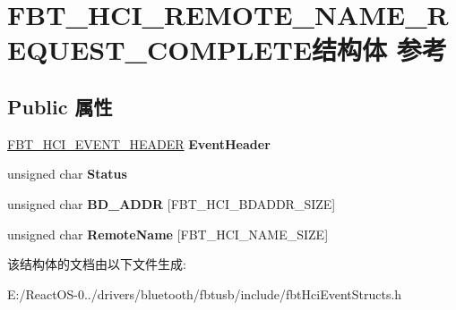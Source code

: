 \hypertarget{struct_f_b_t___h_c_i___r_e_m_o_t_e___n_a_m_e___r_e_q_u_e_s_t___c_o_m_p_l_e_t_e}{}\section{F\+B\+T\+\_\+\+H\+C\+I\+\_\+\+R\+E\+M\+O\+T\+E\+\_\+\+N\+A\+M\+E\+\_\+\+R\+E\+Q\+U\+E\+S\+T\+\_\+\+C\+O\+M\+P\+L\+E\+T\+E结构体 参考}
\label{struct_f_b_t___h_c_i___r_e_m_o_t_e___n_a_m_e___r_e_q_u_e_s_t___c_o_m_p_l_e_t_e}
\subsection*{Public 属性}
\begin{DoxyCompactItemize}
\item 
\mbox{\label{struct_f_b_t___h_c_i___r_e_m_o_t_e___n_a_m_e___r_e_q_u_e_s_t___c_o_m_p_l_e_t_e_a513af5cd5b5a04899b4c8019f7ccb253}} 
\hyperlink{struct_f_b_t___h_c_i___e_v_e_n_t___h_e_a_d_e_r}{F\+B\+T\+\_\+\+H\+C\+I\+\_\+\+E\+V\+E\+N\+T\+\_\+\+H\+E\+A\+D\+ER} {\bfseries Event\+Header}
\item 
\mbox{\label{struct_f_b_t___h_c_i___r_e_m_o_t_e___n_a_m_e___r_e_q_u_e_s_t___c_o_m_p_l_e_t_e_add4969b62272f0f7b13739c239cbbcdc}} 
unsigned char {\bfseries Status}
\item 
\mbox{\label{struct_f_b_t___h_c_i___r_e_m_o_t_e___n_a_m_e___r_e_q_u_e_s_t___c_o_m_p_l_e_t_e_a133ce2e4633febb6b5198749e68cbc93}} 
unsigned char {\bfseries B\+D\+\_\+\+A\+D\+DR} \mbox{[}F\+B\+T\+\_\+\+H\+C\+I\+\_\+\+B\+D\+A\+D\+D\+R\+\_\+\+S\+I\+ZE\mbox{]}
\item 
\mbox{\label{struct_f_b_t___h_c_i___r_e_m_o_t_e___n_a_m_e___r_e_q_u_e_s_t___c_o_m_p_l_e_t_e_ae183dbd8855c2829530a02bc97d68016}} 
unsigned char {\bfseries Remote\+Name} \mbox{[}F\+B\+T\+\_\+\+H\+C\+I\+\_\+\+N\+A\+M\+E\+\_\+\+S\+I\+ZE\mbox{]}
\end{DoxyCompactItemize}


该结构体的文档由以下文件生成\+:\begin{DoxyCompactItemize}
\item 
E\+:/\+React\+O\+S-\/0../drivers/bluetooth/fbtusb/include/fbt\+Hci\+Event\+Structs.\+h\end{DoxyCompactItemize}

